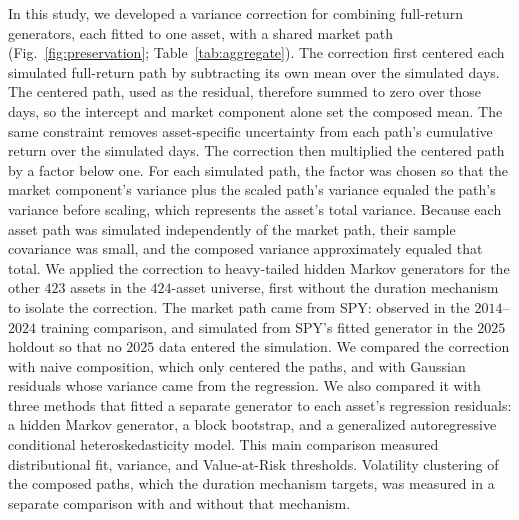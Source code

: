 In this study, we developed a variance correction for combining
full-return generators, each fitted to one asset, with a shared market
path (Fig.~\ref{fig:preservation}; Table~\ref{tab:aggregate}). The
correction first centered each simulated full-return path by
subtracting its own mean over the simulated days. The centered path, used as the residual, therefore summed to zero over
those days, so the intercept and market component alone set the
composed mean. The same constraint removes asset-specific uncertainty
from each path's cumulative return over the simulated days. The correction then multiplied
the centered path by a factor below one. For each simulated path, the factor was chosen so that the market
component's variance plus the scaled path's variance equaled the path's variance before scaling, which represents the
asset's total variance. Because each asset path was simulated
independently of the market path, their sample covariance was small, and the composed variance approximately equaled
that total. We applied the correction to heavy-tailed hidden
Markov generators for the other $423$ assets in the $424$-asset
universe, first without the duration mechanism to isolate the
correction. The market path came from SPY: observed in the
$2014$--$2024$ training comparison, and simulated from SPY's fitted
generator in the $2025$ holdout so that no $2025$ data entered the
simulation. We compared the correction with naive composition, which
only centered the paths, and with Gaussian residuals whose variance
came from the regression. We also compared it with three methods that
fitted a separate generator to each asset's regression residuals: a
hidden Markov generator, a block bootstrap, and a generalized
autoregressive conditional heteroskedasticity model. This main comparison measured distributional fit, variance, and
Value-at-Risk thresholds. Volatility clustering of the composed paths, which the
duration mechanism targets, was measured in a separate comparison with
and without that mechanism.

